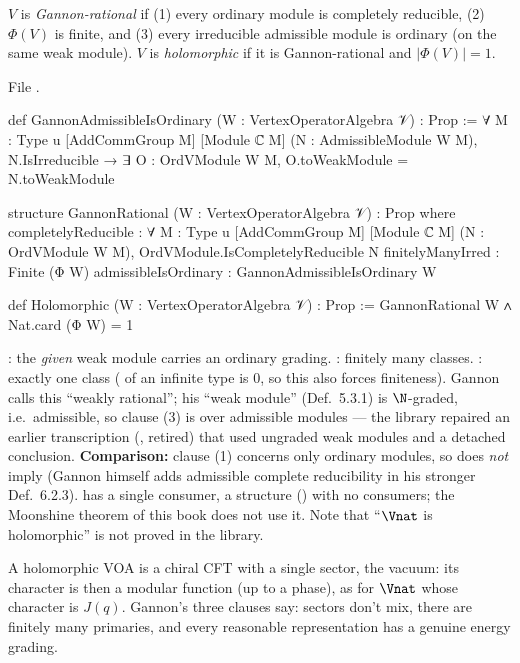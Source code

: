 \begin{definition}\label{l12:def:gannon}
$V$ is \emph{Gannon-rational} if (1) every ordinary module is completely reducible, (2) $\Phi(V)$ is finite, and (3) every
irreducible admissible module is ordinary (on the same weak module). $V$ is \emph{holomorphic} if it is Gannon-rational
and $|\Phi(V)| = 1$.
\end{definition}
\noindent File .
\begin{leancode}
def GannonAdmissibleIsOrdinary (W : VertexOperatorAlgebra 𝒱) : Prop :=
  ∀ {M : Type u} [AddCommGroup M] [Module ℂ M] (N : AdmissibleModule W M),
    N.IsIrreducible → ∃ O : OrdVModule W M, O.toWeakModule = N.toWeakModule

structure GannonRational (W : VertexOperatorAlgebra 𝒱) : Prop where
  completelyReducible : ∀ {M : Type u} [AddCommGroup M] [Module ℂ M] (N : OrdVModule W M),
    OrdVModule.IsCompletelyReducible N
  finitelyManyIrred : Finite (Φ W)
  admissibleIsOrdinary : GannonAdmissibleIsOrdinary W

def Holomorphic (W : VertexOperatorAlgebra 𝒱) : Prop :=
  GannonRational W ∧ Nat.card (Φ W) = 1
\end{leancode}

\begin{dictionary}
: the \emph{given} weak module carries an ordinary grading.
: finitely many classes. : exactly one class ( of an infinite
type is $0$, so this also forces finiteness). Gannon calls this ``weakly rational''; his ``weak module'' (Def.~5.3.1) is
$\N$-graded, i.e.\ admissible, so clause (3) is over admissible modules --- the library repaired an earlier transcription
(, retired) that used ungraded weak modules and a detached conclusion. \textbf{Comparison:} clause (1)
concerns only ordinary modules, so  does \emph{not} imply  (Gannon himself
adds admissible complete reducibility in his stronger Def.~6.2.3).  has a single consumer, a structure
() with no consumers; the Moonshine theorem of this book does not use it. Note that
``$\Vnat$ is holomorphic'' is not proved in the library.
\end{dictionary}

\begin{physics}
A holomorphic VOA is a chiral CFT with a single sector, the vacuum: its character is then a modular function (up to a
phase), as for $\Vnat$ whose character is $J(q)$. Gannon's three clauses say: sectors don't mix, there are finitely many
primaries, and every reasonable representation has a genuine energy grading.
\end{physics}

